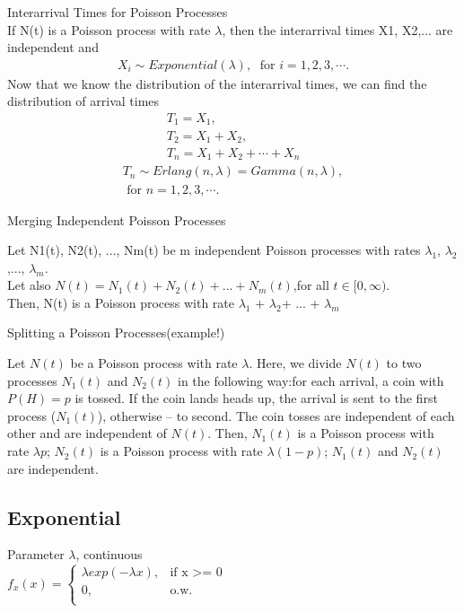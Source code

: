 Interarrival Times for Poisson Processes\\

If N(t) is a Poisson process with rate $\lambda$, then the interarrival times X1, X2,...  are independent and
\begin{align*}
  X_i \sim Exponential(\lambda), \; \textrm{ for }i=1,2,3, \cdots.
\end{align*}
Now that we know the distribution of the interarrival times, we can find the distribution of arrival times \\

\begin{align*}
  T_1=X_1,\\
  T_2=X_1+X_2,\\
  T_n=X_1+X_2+\cdots+X_n 
\end{align*}
\begin{align*}
  T_n \sim Erlang(n,\lambda)=Gamma(n, \lambda), \\ 
  \textrm{ for }n=1,2,3, \cdots.
\end{align*}

Merging Independent Poisson Processes

Let N1(t), N2(t), ..., Nm(t) be m independent Poisson processes with rates $\lambda_1$, $\lambda_2$,..., $\lambda_m$.\\ 
Let also $N(t)=N_{1}(t)+N_{2}(t)+...+N_{m}(t)$,for all $t\in [0,\infty)$.\\
Then, N(t) is a Poisson process with rate $\lambda_1$ + $\lambda_2$+ ... + $\lambda_m$


Splitting a Poisson Processes(example!)

Let $N(t)$ be a Poisson process with rate $\lambda$. Here, we divide $N(t)$ to two processes $N_{1}(t)$ and $N_{2}(t)$ in the following way:for each arrival, a coin with $P(H)=p$ is tossed. If the coin lands heads up, the arrival is sent to the first process ($N_{1}(t)$), otherwise -- to second. The coin tosses are independent of each other and are independent of $N(t)$. Then,
$N_{1}(t)$  is a Poisson process with rate $\lambda p$;
$N_{2}(t)$  is a Poisson process with rate  $\lambda (1 - p)$;
$N_{1}(t)$ and $N_{2}(t)$ are independent.



\subsection*{Exponential}
Parameter $\lambda$, continuous\\
$ f_x(x)=
	\begin{cases}
		 \lambda exp(-\lambda x),&\text{if x >= 0}\\
		0,&\text{o.w.}\\
	\end{cases}
$\\

